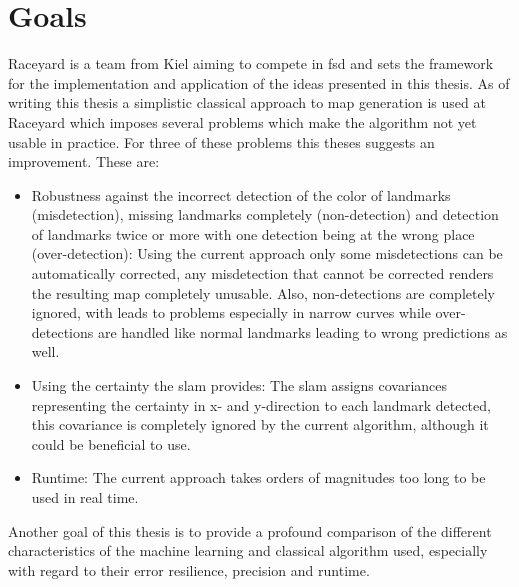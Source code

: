 


\section{Goals}
Raceyard is a team from Kiel aiming to compete in \ac{fsd} and sets the framework for the implementation and application of the ideas presented in this thesis. As of writing this thesis a simplistic classical approach to map generation is used at Raceyard which imposes several problems which make the algorithm not yet usable in practice. For three of these problems this theses suggests an improvement. These are:

\begin{itemize}
    \item Robustness against the incorrect detection of the color of landmarks (misdetection), missing landmarks completely (non-detection) and detection of landmarks twice or more with one detection being at the wrong place (over-detection): Using the current approach only some misdetections can be automatically corrected, any misdetection that cannot be corrected renders the resulting map completely unusable. Also, non-detections are completely ignored, with leads to problems especially in narrow curves while over-detections are handled like normal landmarks leading to wrong predictions as well.
    \item Using the certainty the \ac{slam} provides: The \ac{slam} assigns covariances representing the certainty in x- and y-direction to each landmark detected, this covariance is completely ignored by the current algorithm, although it could be beneficial to use.
    \item Runtime: The current approach takes orders of magnitudes too long to be used in real time.
\end{itemize}

Another goal of this thesis is to provide a profound comparison of the different characteristics of the machine learning and classical algorithm used, especially with regard to their error resilience, precision and runtime.


